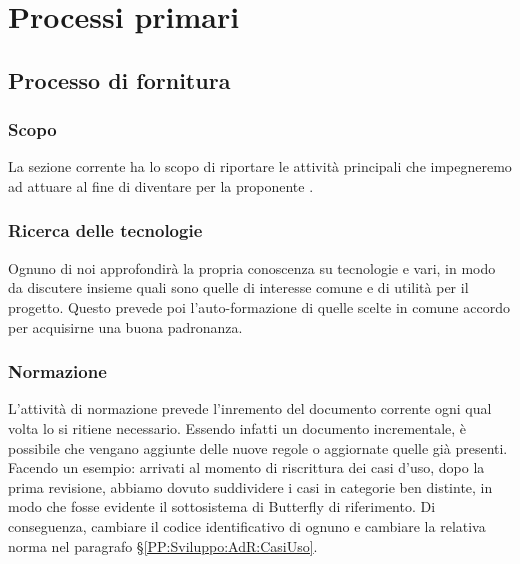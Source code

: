 \section{Processi primari}\label{ProcessiPrimari}

    \subsection{Processo di fornitura}\label{PP:Fornitura}	%

        \subsubsection{Scopo}\label{PP:Fornitura:Scopo}
		La sezione corrente ha lo scopo di riportare le attività principali che impegneremo ad attuare al fine di
		diventare  per la proponente \II.

		\subsubsection{Ricerca delle tecnologie}
		Ognuno di noi approfondirà la propria conoscenza su tecnologie e  vari, in modo da discutere insieme quali sono
		quelle di interesse comune e di utilità per il progetto. Questo prevede poi l'auto-formazione di quelle scelte in comune accordo
		per acquisirne una buona padronanza.

		\subsubsection{Normazione}\label{Normazione} %
		L'attività di normazione prevede l'inremento del documento corrente ogni qual volta lo si ritiene necessario.
		Essendo infatti un documento incrementale, è possibile che vengano aggiunte delle nuove regole o aggiornate quelle già presenti.
		Facendo un esempio: arrivati al momento di riscrittura dei casi d'uso, dopo la prima revisione, abbiamo dovuto suddividere i casi in categorie ben distinte, in modo che fosse evidente il sottosistema di Butterfly di riferimento.
		Di conseguenza, cambiare il codice identificativo di ognuno e cambiare la relativa norma nel paragrafo \S\ref{PP:Sviluppo:AdR:CasiUso}. 

